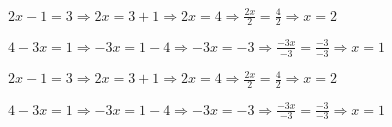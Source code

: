 \begin{alist}
\item $ 2x-1=3\Rightarrow 2x=3+1\Rightarrow 2x=4\Rightarrow \frac{2x}{2}=\frac{4}{2}\Rightarrow x=2 $
\item $ 4-3x=1\Rightarrow -3x=1-4\Rightarrow -3x=-3\Rightarrow \frac{-3x}{-3}=\frac{-3}{-3}\Rightarrow x=1 $
\end{alist}
\begin{alist}
\item $ 2x-1=3\Rightarrow 2x=3+1\Rightarrow 2x=4\Rightarrow \frac{2x}{2}=\frac{4}{2}\Rightarrow x=2 $
\item $ 4-3x=1\Rightarrow -3x=1-4\Rightarrow -3x=-3\Rightarrow \frac{-3x}{-3}=\frac{-3}{-3}\Rightarrow x=1 $
\end{alist}
